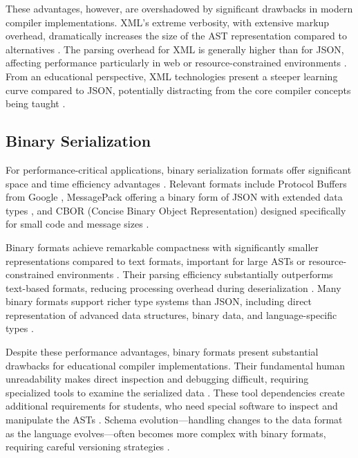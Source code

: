 These advantages, however, are overshadowed by significant drawbacks in modern compiler implementations. XML's extreme verbosity, with extensive markup overhead, dramatically increases the size of the AST representation compared to alternatives \cite{bray1997extensible}. The parsing overhead for XML is generally higher than for JSON, affecting performance particularly in web or resource-constrained environments \cite{nurseitov2009comparison}. From an educational perspective, XML technologies present a steeper learning curve compared to JSON, potentially distracting from the core compiler concepts being taught \cite{nurseitov2009comparison}.

\subsection{Binary Serialization}

For performance-critical applications, binary serialization formats offer significant space and time efficiency advantages \cite{warren2006hacker}. Relevant formats include Protocol Buffers from Google \cite{varda2008protocol}, MessagePack offering a binary form of JSON with extended data types \cite{furuhashi2013messagepack}, and CBOR (Concise Binary Object Representation) designed specifically for small code and message sizes \cite{bormann2013cbor}.

Binary formats achieve remarkable compactness with significantly smaller representations compared to text formats, important for large ASTs or resource-constrained environments \cite{warren2006hacker}. Their parsing efficiency substantially outperforms text-based formats, reducing processing overhead during deserialization \cite{warren2006hacker}. Many binary formats support richer type systems than JSON, including direct representation of advanced data structures, binary data, and language-specific types \cite{varda2008protocol}.

Despite these performance advantages, binary formats present substantial drawbacks for educational compiler implementations. Their fundamental human unreadability makes direct inspection and debugging difficult, requiring specialized tools to examine the serialized data \cite{warren2006hacker}. These tool dependencies create additional requirements for students, who need special software to inspect and manipulate the ASTs \cite{varda2008protocol}. Schema evolution—handling changes to the data format as the language evolves—often becomes more complex with binary formats, requiring careful versioning strategies \cite{varda2008protocol}.


